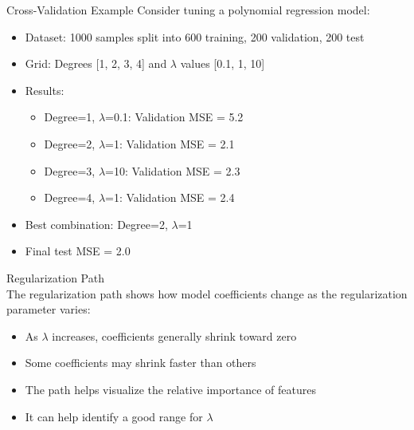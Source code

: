\begin{example}{Cross-Validation Example}
Consider tuning a polynomial regression model:
\begin{itemize}
    \item Dataset: 1000 samples split into 600 training, 200 validation, 200 test
    \item Grid: Degrees [1, 2, 3, 4] and $\lambda$ values [0.1, 1, 10]
    \item Results:
    \begin{itemize}
        \item Degree=1, $\lambda$=0.1: Validation MSE = 5.2
        \item Degree=2, $\lambda$=1: Validation MSE = 2.1
        \item Degree=3, $\lambda$=10: Validation MSE = 2.3
        \item Degree=4, $\lambda$=1: Validation MSE = 2.4
    \end{itemize}
    \item Best combination: Degree=2, $\lambda$=1
    \item Final test MSE = 2.0
\end{itemize}
\end{example}

\begin{concept}{Regularization Path}\\
The regularization path shows how model coefficients change as the regularization parameter varies:
\begin{itemize}
    \item As $\lambda$ increases, coefficients generally shrink toward zero
    \item Some coefficients may shrink faster than others
    \item The path helps visualize the relative importance of features
    \item It can help identify a good range for $\lambda$
\end{itemize}
\end{concept}
